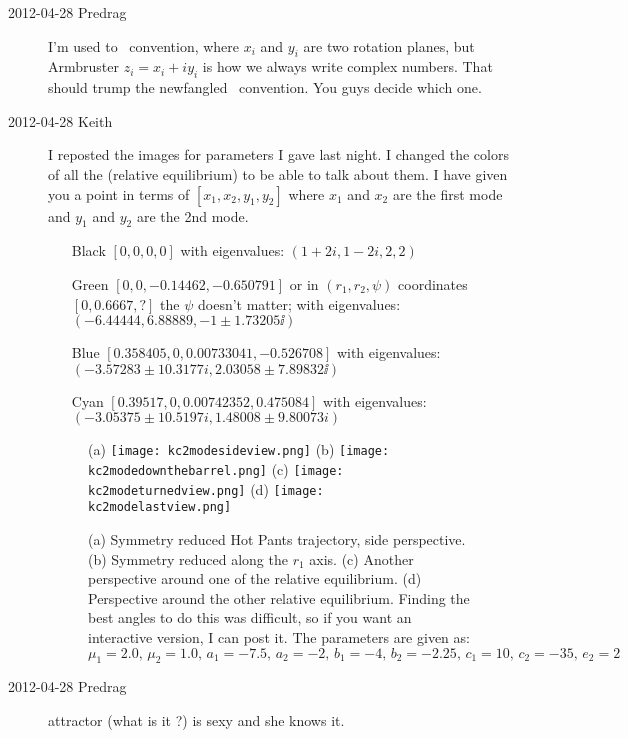 \begin{description}
\item[2012-04-28 Predrag]
I'm used to \cLe\ convention, where $x_i$ and $y_i$ are
two rotation planes, but Armbruster $z_i = x_i + i y_i$ is how we always write
complex numbers. That should trump the newfangled \cLe\ convention.
You guys decide which one.

\item[2012-04-28 Keith] I reposted the images for parameters I gave last
night.  I changed the colors of all the (relative equilibrium) to be able
to talk about them.  I have given you a point in terms of $[x_1, x_2,
y_1, y_2]$ where $x_1$ and $x_2$ are the first mode and $y_1$ and $y_2$
are the 2nd mode.
\begin{itemize}
    \item[Black] $[0,0,0,0]$ with eigenvalues: $(1+2i,1-2i,2,2)$
    \item[Green] $[0,0,-0.14462,-0.650791]$ or in $(r_1, r_2, \psi)$
    coordinates $[0, 0.6667, ?]$ the $\psi$ doesn't matter; with eigenvalues:
    $(-6.44444,6.88889,-1 \pm 1.73205\ii)$
    \item[Blue] $[0.358405,0,0.00733041,-0.526708]$
    with eigenvalues: $(-3.57283 \pm 10.3177i,2.03058 \pm 7.89832\ii)$
    \item[Cyan] $[0.39517,0,0.00742352,0.475084]$
    with eigenvalues:  $(-3.05375 \pm 10.5197i,1.48008 \pm 9.80073i)$
\end{itemize}

\begin{figure}[H]
\centering
 (a) \texttt{[image: kc2modesideview.png]}
 (b) \texttt{[image: kc2modedownthebarrel.png]}
 (c) \texttt{[image: kc2modeturnedview.png]}
 (d) \texttt{[image: kc2modelastview.png]}
\caption{
(a) Symmetry reduced Hot Pants trajectory, side perspective.
(b) Symmetry reduced along the $r_1$ axis.
(c) Another perspective around one of the relative equilibrium. (d)
Perspective around the other relative equilibrium.
Finding the best angles to do this was difficult, so if you want an
interactive version, I can post it. The parameters are given as:
    $\mu_1 = 2.0 ,\, \mu_2 = 1.0,\, a_1 = -7.5,\, a_2 = -2,\, b_1 = -4,\,
       b_2 = -2.25,\, c_1 = 10,\, c_2 = -35,\, e_2 = 2$
}
\label{fig:2moderedmultieq}
\end{figure}

\item[2012-04-28 Predrag]  attractor (what is it ?) is sexy and she
knows it.


\end{description}
